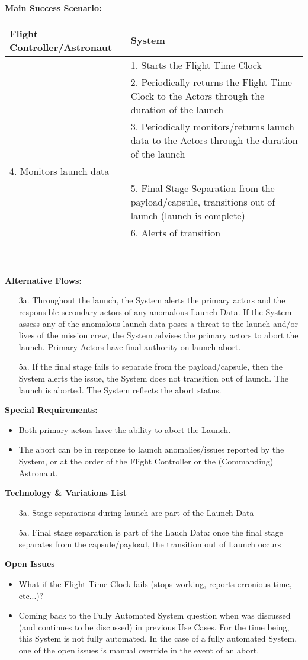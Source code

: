 \documentclass[letterpaper]{article}
\begin{document}
\textbf{Main Success Scenario:  }\\
\begin{tabular}{|p{5.75cm}|p{5.75cm}|}\hline
\textbf{Flight Controller/Astronaut}&\textbf{System}\\\hline
&1. Starts the Flight Time Clock\\\hline
&2. Periodically returns the Flight Time Clock to the Actors through
the duration of the launch\\\hline
&3. Periodically monitors/returns launch data to the Actors through
the duration of the launch\\\hline
4.  Monitors launch data &\\\hline
&5. Final Stage Separation from the payload/capsule, transitions out
of launch (launch is complete)\\\hline
&6. Alerts of transition\\\hline
\end{tabular}\\\\
\textbf{Alternative Flows:}
\begin{itemize}
\item[3a.]Throughout the launch, the System alerts the primary actors
and the responsible secondary actors of any anomalous Launch Data.
If the System assess any of the anomalous launch data poses a threat
to the launch and/or lives of the mission crew, the System advises the
primary actors to abort the launch.  Primary Actors have final
authority on launch abort.
\item[5a.]If the final stage fails to separate from the
payload/capsule, then the System alerts the issue, the System does not
transition out of launch.  The launch is aborted.  The
System reflects the abort status.
\end{itemize}
\textbf{Special Requirements:}
\begin{itemize}
\item Both primary actors have the ability to abort the Launch.
\item The abort can be in response to launch anomalies/issues
reported by the System, or at the order of the Flight Controller or
the (Commanding) Astronaut.
\end{itemize}
\textbf{Technology \& Variations List}
\begin{itemize}
\item[3a.]Stage separations during launch are part of the Launch
Data
\item[5a.]Final stage separation is part of the Lauch Data:
once the final stage separates from the capsule/payload, the
transition out of Launch occurs
\end{itemize}
\textbf{Open Issues}
\begin{itemize}
\item What if the Flight Time Clock fails (stops working, reports
erronious time, etc...)?
\item Coming back to the Fully Automated System question when was
discussed (and continues to be discussed) in previous Use Cases.  For
the time being, this System is not fully automated.  In the case
of a fully automated System, one of the open issues is manual override
in the event of an abort.
\end{itemize}
\end{document}
